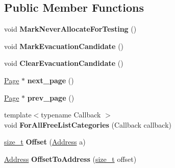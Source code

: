 \subsection*{Public Member Functions}
\begin{DoxyCompactItemize}
\item 
\mbox{\label{classv8_1_1internal_1_1Page_a5c856d3b592f8efb1496253bf2d84a31}} 
void {\bfseries Mark\+Never\+Allocate\+For\+Testing} ()
\item 
\mbox{\label{classv8_1_1internal_1_1Page_a85a5bffb7d73260bd1537382347f5a71}} 
void {\bfseries Mark\+Evacuation\+Candidate} ()
\item 
\mbox{\label{classv8_1_1internal_1_1Page_aa72911874736f4a6fba28396cc740a81}} 
void {\bfseries Clear\+Evacuation\+Candidate} ()
\item 
\mbox{\label{classv8_1_1internal_1_1Page_ab3039477896578b3c8e18ad8ed24e6b0}} 
\mbox{\hyperlink{classv8_1_1internal_1_1Page}{Page}} $\ast$ {\bfseries next\+\_\+page} ()
\item 
\mbox{\label{classv8_1_1internal_1_1Page_a796eeeb1cc8b8dd9b75b102d8eaa2223}} 
\mbox{\hyperlink{classv8_1_1internal_1_1Page}{Page}} $\ast$ {\bfseries prev\+\_\+page} ()
\item 
\mbox{\label{classv8_1_1internal_1_1Page_a4f5fcd786532dff7189ee94d93edb0b4}} 
{\footnotesize template$<$typename Callback $>$ }\\void {\bfseries For\+All\+Free\+List\+Categories} (Callback callback)
\item 
\mbox{\label{classv8_1_1internal_1_1Page_a1b78829b4ad414f0a81c48b311b02eb5}} 
\mbox{\hyperlink{classsize__t}{size\+\_\+t}} {\bfseries Offset} (\mbox{\hyperlink{classuintptr__t}{Address}} a)
\item 
\mbox{\label{classv8_1_1internal_1_1Page_a79c8511ff7738cd6453f0608522ae34d}} 
\mbox{\hyperlink{classuintptr__t}{Address}} {\bfseries Offset\+To\+Address} (\mbox{\hyperlink{classsize__t}{size\+\_\+t}} offset)

\end{DoxyCompactItemize}
